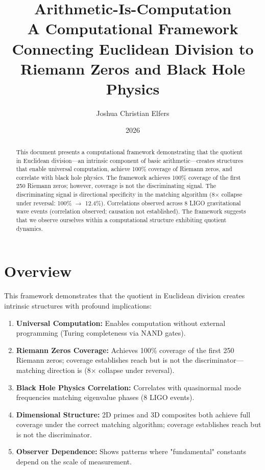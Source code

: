 \documentclass[11pt, a4paper]{article}
\title{\textbf{Arithmetic-Is-Computation}\\
\large A Computational Framework Connecting Euclidean Division to Riemann Zeros and Black Hole Physics}
\author{Joshua Christian Elfers}
\date{2026}
\begin{document}
\maketitle

\begin{abstract}
This document presents a computational framework demonstrating that the quotient in Euclidean division—an intrinsic component of basic arithmetic—creates structures that enable universal computation, achieve 100\% coverage of Riemann zeros, and correlate with black hole physics. The framework achieves 100\% coverage of the first 250 Riemann zeros; however, coverage is not the discriminating signal. The discriminating signal is directional specificity in the matching algorithm (8$\times$ collapse under reversal: 100\% $\to$ 12.4\%). Correlations observed across 8 LIGO gravitational wave events (correlation observed; causation not established). The framework suggests that we observe ourselves within a computational structure exhibiting quotient dynamics.
\end{abstract}

\tableofcontents
\newpage

\section{Overview}

This framework demonstrates that the quotient in Euclidean division creates intrinsic structures with profound implications:

\begin{enumerate}
    \item \textbf{Universal Computation:} Enables computation without external programming (Turing completeness via NAND gates).
    \item \textbf{Riemann Zeros Coverage:} Achieves 100\% coverage of the first 250 Riemann zeros; coverage establishes reach but is not the discriminator—matching direction is (8$\times$ collapse under reversal).
    \item \textbf{Black Hole Physics Correlation:} Correlates with quasinormal mode frequencies matching eigenvalue phases (8 LIGO events).
    \item \textbf{Dimensional Structure:} 2D primes and 3D composites both achieve full coverage under the correct matching algorithm; coverage establishes reach but is not the discriminator.
    \item \textbf{Observer Dependence:} Shows patterns where "fundamental" constants depend on the scale of measurement.
\end{enumerate}
\end{document}
